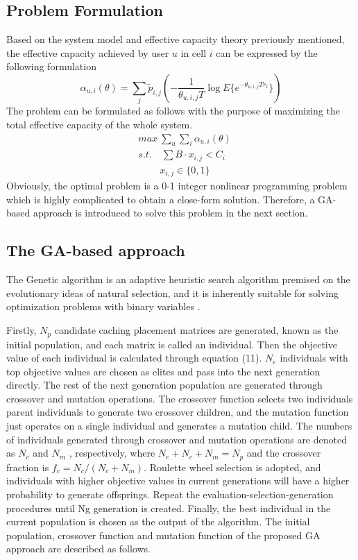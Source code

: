 \documentclass[conference]{IEEEtran}
\begin{document}
\subsection{Problem Formulation}
Based on the system model and effective capacity theory previously mentioned, the effective capacity achieved by user $u$ in cell $i$ can be expressed by the following formulation
\begin{equation}
\alpha_{u,i}(\theta)=\sum_j{\tilde{p}_{i,j}}(-\frac{1}{\theta_{u,i,j}T}\log E\{e^{-\theta_{u,i,j}Tr_i}\})
\end{equation}
The problem can be formulated as follows with the purpose of maximizing the total effective capacity of the whole system.
\begin{equation}
 \begin{aligned}
   & {max}\ \sum_u\sum_i\alpha_{u,i}(\theta)\\
   & s.t. \quad\sum B\cdot x_{i,j}<C_i\\
   & \qquad \ x_{i,j}\in\{0,1\}
 \end{aligned}
\end{equation}
Obviously, the optimal problem is a 0-1 integer nonlinear programming problem which is highly complicated to obtain a close-form solution. Therefore, a GA-based approach is introduced to solve this problem in the next section.

\subsection{The GA-based approach}
The Genetic algorithm is an adaptive heuristic search algorithm premised on the evolutionary ideas of natural selection, and it is inherently suitable for solving optimization problems with binary variables \cite{Srinivas2002Genetic}.

Firstly, $N_p$ candidate caching placement matrices are generated, known as the initial population, and each matrix is called an individual. Then the objective value of each individual is calculated through equation (11). $N_e$ individuals with top objective values are chosen as elites and pass into the next generation directly. The rest of the next generation population are generated through crossover and mutation operations. The crossover function selects two individuals parent individuals to generate two crossover children, and the mutation function just operates on a single individual and generates a mutation child. The numbers of individuals generated through crossover and mutation operations are denoted as $N_c$ and $N_m$ , respectively, where $N_e+N_c+N_m=N_p$ and the crossover fraction is $f_c=N_c/ (N_c+N_m)$. Roulette wheel selection is adopted, and individuals with higher objective values in current generations will have a higher probability to generate offsprings. Repeat the evaluation-selection-generation procedures until Ng generation is created. Finally, the best individual in the current population is chosen as the output of the algorithm. The initial population, crossover function and mutation function of the proposed GA approach are described as follows.
\end{document}
